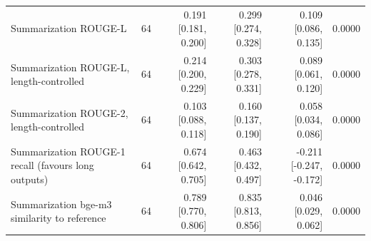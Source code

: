 \begin{table}[t]
\begin{tabular}{lrrrrr}
Summarization ROUGE-L & 64 & 0.191 [0.181, 0.200] & 0.299 [0.274, 0.328] & 0.109 [0.086, 0.135] & 0.0000 \\
Summarization ROUGE-L, length-controlled & 64 & 0.214 [0.200, 0.229] & 0.303 [0.278, 0.331] & 0.089 [0.061, 0.120] & 0.0000 \\
Summarization ROUGE-2, length-controlled & 64 & 0.103 [0.088, 0.118] & 0.160 [0.137, 0.190] & 0.058 [0.034, 0.086] & 0.0000 \\
Summarization ROUGE-1 recall (favours long outputs) & 64 & 0.674 [0.642, 0.705] & 0.463 [0.432, 0.497] & -0.211 [-0.247, -0.172] & 0.0000 \\
Summarization bge-m3 similarity to reference & 64 & 0.789 [0.770, 0.806] & 0.835 [0.813, 0.856] & 0.046 [0.029, 0.062] & 0.0000 \\
\bottomrule
\end{tabular}
\end{table}

